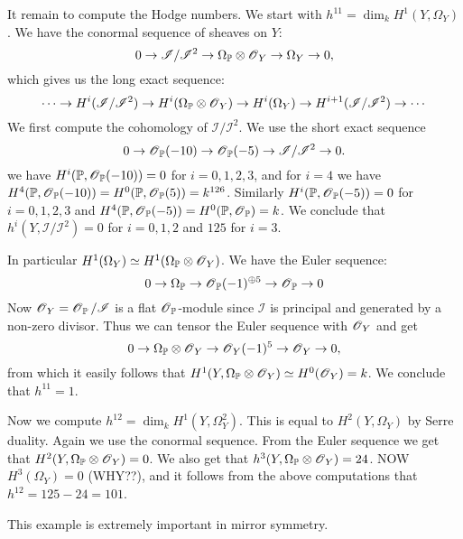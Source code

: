 \documentclass[11pt, english]{article}
\begin{document}
It remain to compute the Hodge numbers. We start with $h^{11} = \dim_k H^1(Y,\Omega_Y)$. We have the conormal sequence of sheaves on $Y$:
$$
0 \to \mathscr I / \mathscr I^2 \to \Omega_{\mathbb{P}} \otimes \operatorname{\mathscr{O}}_Y \to \Omega_Y \to 0,
$$
which gives us the long exact sequence:
$$
\cdots \to H^i(\mathscr I/\mathscr I^2) \to H^i(\Omega_{\mathbb{P}} \otimes \operatorname{\mathscr{O}}_Y) \to H^i(\Omega_Y) \to H^{i+1}(\mathscr I/\mathscr I^2) \to \cdots 
$$
We first compute the cohomology of $\mathscr I/\mathscr I^2$. We use the short exact sequence
\begin{equation}
\label{normaleq}
0 \to \operatorname{\mathscr{O}}_{\mathbb{P}}(-10) \to \operatorname{\mathscr{O}}_{\mathbb{P}}(-5) \to \mathscr I / \mathscr I^2 \to 0.
\end{equation}
we have $H^i(\mathbb{P},\operatorname{\mathscr{O}}_{\mathbb{P}}(-10))=0$ for $i=0,1,2,3$, and for $i=4$ we have $H^4(\mathbb{P},\operatorname{\mathscr{O}}_{\mathbb{P}}(-10))=H^0(\mathbb{P},\operatorname{\mathscr{O}}_{\mathbb{P}}(5))=k^{126}$. Similarly $H^i(\mathbb{P},\operatorname{\mathscr{O}}_{\mathbb{P}}(-5))=0$ for $i=0,1,2,3$ and $H^4(\mathbb{P},\operatorname{\mathscr{O}}_{\mathbb{P}}(-5))=H^0(\mathbb{P},\operatorname{\mathscr{O}}_{\mathbb{P}})=k$. We conclude that $h^i(Y,\mathscr I/\mathscr I^2) = 0$ for $i=0,1,2$ and $125$ for $i=3$.

In particular $H^1(\Omega_Y) \simeq H^1(\Omega_{\mathbb{P}} \otimes \operatorname{\mathscr{O}}_Y)$. We have the Euler sequence:
$$
0 \to \Omega_{\mathbb{P}} \to \operatorname{\mathscr{O}}_{\mathbb{P}}(-1)^{\oplus 5} \to \operatorname{\mathscr{O}}_{\mathbb{P}} \to 0
$$
Now $\operatorname{\mathscr{O}}_Y=\operatorname{\mathscr{O}}_{\mathbb{P}}/\mathscr I$ is a flat $\operatorname{\mathscr{O}}_{\mathbb{P}}$-module since $\mathscr I$ is principal and generated by a non-zero divisor. Thus we can tensor the Euler sequence with $\operatorname{\mathscr{O}}_Y$ and get
$$
0 \to \Omega_{\mathbb{P}} \otimes \operatorname{\mathscr{O}}_Y \to \operatorname{\mathscr{O}}_Y(-1)^5 \to \operatorname{\mathscr{O}}_Y \to 0,
$$
from which it easily follows that $H^1(Y,\Omega_{\mathbb{P}} \otimes \operatorname{\mathscr{O}}_Y) \simeq H^0(\operatorname{\mathscr{O}}_Y) = k$. We conclude that $h^{11}=1$. 

Now we compute $h^{12} = \dim_k H^1(Y,\Omega_Y^2)$. This is equal to $H^2(Y, \Omega_Y)$ by Serre duality. Again we use the conormal sequence. From the Euler sequence we get that $H^2(Y, \Omega_{\mathbb{P}} \otimes \operatorname{\mathscr{O}}_Y)=0$. We also get that $h^3(Y,\Omega_{\mathbb{P}} \otimes \operatorname{\mathscr{O}}_Y)=24$. NOW $H^3(\Omega_Y)=0$ (WHY??), and it follows from the above computations that $h^{12}=125-24=101$.

This example is extremely important in mirror symmetry.



\end{document}
